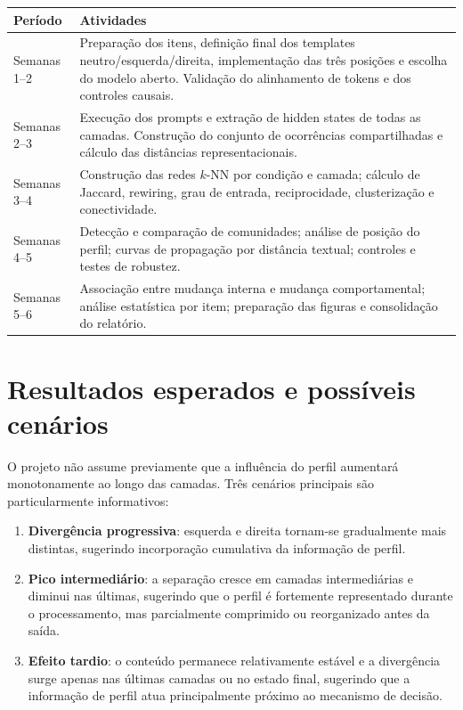 \documentclass[11pt,a4paper]{article}
\begin{document}
\begin{longtable}{>{\raggedright\arraybackslash}p{2.2cm} p{12.2cm}}
\toprule
\textbf{Período} & \textbf{Atividades} \\
\midrule
Semanas 1--2 & Preparação dos itens, definição final dos templates neutro/esquerda/direita, implementação das três posições e escolha do modelo aberto. Validação do alinhamento de tokens e dos controles causais. \\
\addlinespace
Semanas 2--3 & Execução dos prompts e extração de hidden states de todas as camadas. Construção do conjunto de ocorrências compartilhadas e cálculo das distâncias representacionais. \\
\addlinespace
Semanas 3--4 & Construção das redes $k$-NN por condição e camada; cálculo de Jaccard, rewiring, grau de entrada, reciprocidade, clusterização e conectividade. \\
\addlinespace
Semanas 4--5 & Detecção e comparação de comunidades; análise de posição do perfil; curvas de propagação por distância textual; controles e testes de robustez. \\
\addlinespace
Semanas 5--6 & Associação entre mudança interna e mudança comportamental; análise estatística por item; preparação das figuras e consolidação do relatório. \\
\bottomrule
\end{longtable}

\section{Resultados esperados e possíveis cenários}

O projeto não assume previamente que a influência do perfil aumentará monotonamente ao longo das camadas. Três cenários principais são particularmente informativos:

\begin{enumerate}
    \item \textbf{Divergência progressiva}: esquerda e direita tornam-se gradualmente mais distintas, sugerindo incorporação cumulativa da informação de perfil.

    \item \textbf{Pico intermediário}: a separação cresce em camadas intermediárias e diminui nas últimas, sugerindo que o perfil é fortemente representado durante o processamento, mas parcialmente comprimido ou reorganizado antes da saída.

    \item \textbf{Efeito tardio}: o conteúdo permanece relativamente estável e a divergência surge apenas nas últimas camadas ou no estado final, sugerindo que a informação de perfil atua principalmente próximo ao mecanismo de decisão.
\end{enumerate}
\end{document}
